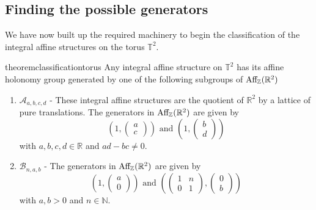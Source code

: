 \subsection{Finding the possible generators}
We have now built up the required machinery to begin the classification of the
integral affine structures on the torus $\mathbb{T}^2$.
\begin{restatable}{theorem}{classificationtorus}
    \label{thm:classification-torus}
    Any integral affine structure on $\mathbb{T}^2$ has its affine holonomy group generated by one of the following subgroups of $\text{Aff}_{\mathbb{Z}}(\mathbb{R}^2)$
    \begin{enumerate}
        \item $\mathcal{A}_{a,b,c,d}$ - These integral affine structures are the quotient of $\mathbb{R}^2$ by a lattice of pure translations. The generators in $\text{Aff}_{\mathbb{Z}}(\mathbb{R}^2)$ are given by
              $$\left( 1, \begin{pmatrix}
                          a \\ c
                      \end{pmatrix} \right) \text{ and } \left( 1, \begin{pmatrix}
                          b \\ d
                      \end{pmatrix} \right)$$
              with $a,b,c,d \in \mathbb{R}$ and $ad-bc \neq 0$.
        \item $\mathcal{B}_{n,a,b}$ - The generators in $\text{Aff}_{\mathbb{Z}}(\mathbb{R}^2)$ are given by
              $$\left( 1, \begin{pmatrix}
                          a \\ 0
                      \end{pmatrix} \right) \text{ and } \left( \begin{pmatrix}
                          1 & n \\
                          0 & 1
                      \end{pmatrix}, \begin{pmatrix}
                          0 \\ b
                      \end{pmatrix} \right)$$
              with $a,b > 0$ and $n \in \mathbb{N}$.
    \end{enumerate}
\end{restatable}

